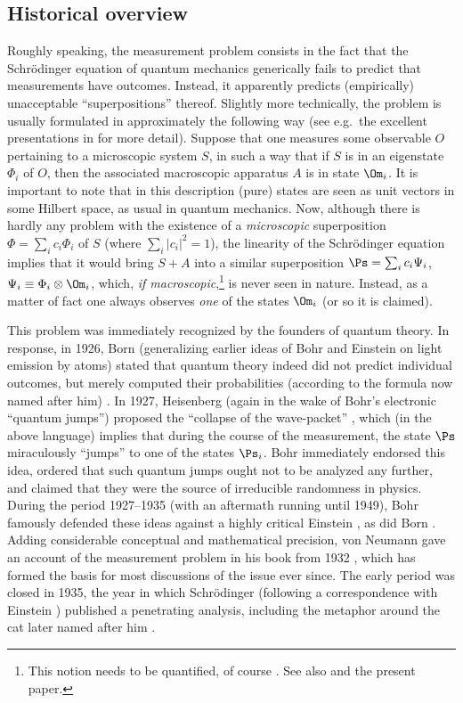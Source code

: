 \documentclass[12pt]{article}
\begin{document}
 \subsection{Historical overview}\label{histo}
 Roughly speaking, the measurement  problem consists in the fact that the Schr\"{o}dinger equation of quantum mechanics generically fails to predict that measurements have outcomes. Instead, it apparently predicts (empirically) unacceptable ``superpositions'' thereof.  Slightly more technically, the problem is usually formulated in approximately the following way
(see e.g.\ the excellent presentations in \cite{BG,Bub,BLM} for more detail). Suppose that one measures some observable $O$ pertaining to 
 a microscopic system $S$, in such a way that if $S$ is in an eigenstate  $\Phi_i$ of $O$, then the associated macroscopic apparatus $A$ is in state $\Om_i$. It is important to note that in this description  (pure) states are seen as unit vectors in some Hilbert space, as usual in quantum mechanics.
Now, although there is hardly any  problem with the existence of a \emph{microscopic} superposition $\Phi= \sum_i c_i \Phi_i$ of $S$ (where $\sum_i |c_i|^2=1$), the linearity of the  Schr\"{o}dinger equation implies that it would bring $S+A$ into a similar superposition  $\Ps=\sum_i c_i \Psi_i$, $\Psi_i\equiv\Phi_i\otimes \Om_i$, which,  \emph{if macroscopic},\footnote{This notion needs to be quantified, of course \cite{BG,BLM}. See also \cite{handbook} and the present paper.} is never seen in nature. Instead,  as a matter of fact one always observes \emph{one} of the states $\Om_i$ (or so it is claimed). 

This problem was immediately recognized by the founders of quantum theory.  In response, in 1926, Born (generalizing earlier ideas of  Bohr and Einstein on light emission by atoms) stated that quantum theory indeed did not predict individual outcomes, but merely computed their probabilities (according to the formula now named after him) \cite{Born,LanBorn}. In 
1927, Heisenberg (again in the wake of Bohr's  electronic ``quantum jumps'') proposed the ``collapse of the wave-packet'' \cite{Hei1927}, which (in the above language) implies that during the course of the measurement, the  state $\Ps$  miraculously ``jumps'' to one of the states $\Ps_i$.  Bohr immediately endorsed this idea, ordered that such quantum jumps ought not to be analyzed any further, and claimed that they were the source of irreducible randomness in physics. During the period 1927--1935 (with an aftermath running until 1949), Bohr famously defended these ideas against a highly critical  Einstein \cite{Bohr1949}, as did Born \cite{BEB}. Adding considerable conceptual and mathematical precision, von Neumann gave an account of the measurement  problem  in his book from 1932 \cite{vN32}, which has formed the basis for most discussions of the  issue ever since. The early period was closed in 1935, the year in which 
 Schr\"{o}dinger  (following a correspondence with Einstein \cite{FineSG}) published a penetrating analysis, including the metaphor around the cat later named after him \cite{Sch1935}.
 
\end{document}
